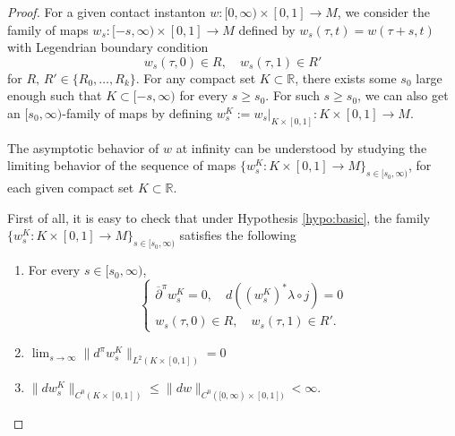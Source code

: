 \documentclass[reqno]{amsart}
\def\R{\ifmmode{\mathbb R}\else{$\mathbb R$}\fi} %
\theoremstyle{theorem}
\theoremstyle{definition}
\numberwithin{equation}{section}
\def\R{{\mathbb R}}
\def\R{{\mathbb R}}
\def\delbar{{\overline \partial}}
\def\R{\ifmmode{\mathbb R}\else{$\mathbb R$}\fi} %
\def\R{{\mathbb R}}
\def\R{{\mathbb R}}
\def\delbar{{\overline \partial}}
\begin{document}
\begin{proof}
For a given contact instanton $w: [0, \infty)\times [0,1]\to M$, we consider the family of maps
$w_s: [-s, \infty) \times [0,1] \to M$ defined by
$w_s(\tau, t) = w(\tau + s, t)$ with Legendrian boundary condition
$$
w_s(\tau,0) \in R, \quad w_s(\tau,1) \in R'
$$
for $R,\, R' \in \{R_0, \ldots, R_k\}$.
For any compact set $K\subset \R$, there exists some $s_0$ large enough such that
$K\subset [-s, \infty)$ for every $s\geq s_0$. For such $s\geq s_0$, we can also get an $[s_0, \infty)$-family of maps by defining $w^K_s:=w_s|_{K\times [0,1]}:K\times [0,1]\to M$.

The asymptotic behavior of $w$ at infinity can be understood by studying the limiting behavior of the sequence of maps
$\{w^K_s:K\times [0,1]\to M\}_{s\in [s_0, \infty)}$, for each given compact set $K\subset \R$.

First of all,
it is easy to check that under Hypothesis \ref{hypo:basic}, the family
$\{w^K_s:K\times [0,1]\to M\}_{s\in [s_0, \infty)}$ satisfies the following
\begin{enumerate}
\item
For every $s\in [s_0, \infty)$,
$$
\begin{cases}
\delbar^\pi w^K_s=0, \quad d((w^K_s)^*\lambda\circ j)=0 \\
w_s(\tau,0) \in R, \quad w_s(\tau,1) \in R'.
\end{cases}
$$
\item $\lim_{s\to \infty}\|d^\pi w^K_s\|_{L^2(K\times [0,1])}=0$
\item $\|d w^K_s\|_{C^0(K\times [0,1])}\leq \|d w\|_{C^0([0, \infty)\times [0,1])}<\infty$.
\end{enumerate}


\end{proof}
\end{document}
